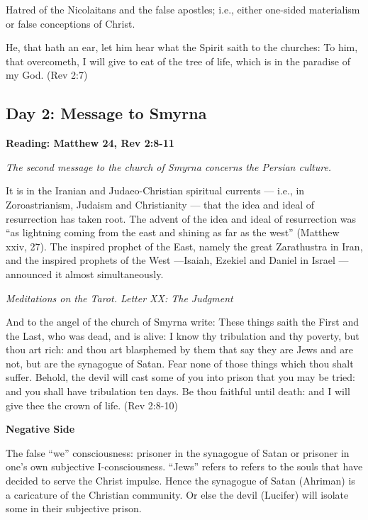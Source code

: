 Hatred of the Nicolaitans and the false apostles; i.e., either one-sided materialism or false conceptions of Christ.

He, that hath an ear, let him hear what the Spirit saith to the churches: To him, that overcometh, I will give to eat of
the tree of life, which is in the paradise of my God. (Rev 2:7)

\subsection*{Day 2: Message to Smyrna}
\textbf{Reading: Matthew 24, Rev 2:8-11}

\emph{The second message to the church of Smyrna concerns the Persian culture.}

\begin{quotationx}
It is in the Iranian and Judaeo-Christian spiritual currents — i.e., in Zoroastrianism, Judaism and
Christianity — that the idea and ideal of resurrection has taken root. The advent of the idea and
ideal of resurrection was “as lightning coming from the east and shining as far as the west” (Matthew xxiv, 27). The
inspired prophet of the East, namely the great Zarathustra in Iran, and the inspired prophets of the West
—Isaiah, Ezekiel and Daniel in Israel — announced it almost simultaneously.
\begin{flushright} \emph{Meditations on the Tarot. Letter XX: The Judgment}\end{flushright}

\end{quotationx}
And to the angel of the church of Smyrna write: These things saith the First and the Last, who was dead, and is alive: I
know thy tribulation and thy poverty, but thou art rich: and thou art blasphemed by them that say they are Jews and are
not, but are the synagogue of Satan. Fear none of those things which thou shalt suffer. Behold, the devil will cast
some of you into prison that you may be tried: and you shall have tribulation ten days. Be thou faithful until death:
and I will give thee the crown of life. (Rev 2:8-10)

\textbf{Negative Side}

The false “we” consciousness: prisoner in the synagogue of Satan or prisoner in one's own
subjective I-consciousness. “Jews” refers to refers to the souls that have decided to serve the Christ impulse. Hence
the synagogue of Satan (Ahriman) is a caricature of the Christian community. Or else the devil (Lucifer) will isolate
some in their subjective prison.

